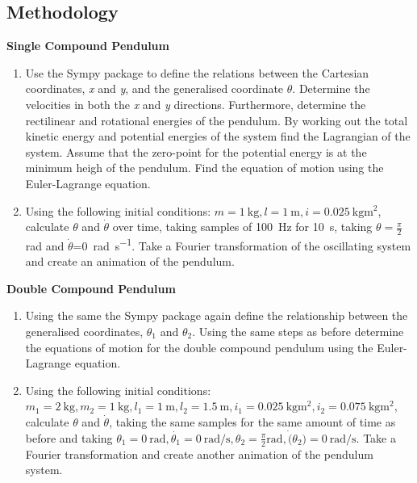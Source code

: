 \documentclass[12pt, a4paper]{article}
\begin{document}
\subsection{Methodology}
\textbf{Single Compound Pendulum}
\begin{enumerate}
    \item Use the Sympy package to define the relations between the Cartesian coordinates, \textit{x} and
    \textit{y}, and the generalised coordinate \textit{\(\theta\)}. Determine the velocities in both the \textit{x} and \textit{y} directions. Furthermore, determine the rectilinear and rotational energies of the pendulum. By working out the total kinetic energy and potential energies of the system find the Lagrangian of the system. Assume that the zero-point for the potential energy is at the minimum heigh of the pendulum. Find the equation of motion using the Euler-Lagrange equation. 
    \item Using the following initial conditions: \(m = \qty{1}{\kilogram}, l = \qty{1}{\meter}, i = \qty{0.025}{\kilogram\metre\squared}\), calculate \(\theta\) and \(\dot{\theta}\) over time, taking samples of \qty{100}{\hertz} for \qty{10}{\second}, taking \(\theta = \frac{\pi}{2}\)\unit{\radian} and \(\dot{\theta}\)=\qty{0}{\radian\per\second}. Take a Fourier transformation of the oscillating system and create an animation of the pendulum.
\end{enumerate}
\textbf{Double Compound Pendulum}
\begin{enumerate}
    \item Using the same the Sympy package again define the relationship between the generalised coordinates, \(\theta_1\) and \(\theta_2\). Using the same steps as before determine the equations of motion for the double compound pendulum using the Euler-Lagrange equation. 
    \item  Using the following initial conditions: \(m_1 = \qty{2}{\kilogram}, m_2 = \qty{1}{\kilogram}, l_1 = \qty{1}{\meter}, l_2 = \qty{1.5}{\meter}, i_1 = \qty{0.025}{\kilogram\meter\squared}, i_2 = \qty{0.075}{\kilogram\meter\squared}\), calculate \(\theta\) and \(\dot{\theta}\), taking the same samples for the same amount of time as before and taking \(\theta_1 = \qty{0}{\radian}, \dot{\theta_1} = \qty{0}{\radian\per\second}, \theta_2 = \frac{\pi}{2}\unit{\radian}, \dot(\theta_2) = \qty{0}{\radian\per\second}\). Take a Fourier transformation and create another animation of the pendulum system. 
\end{enumerate}
\end{document}
